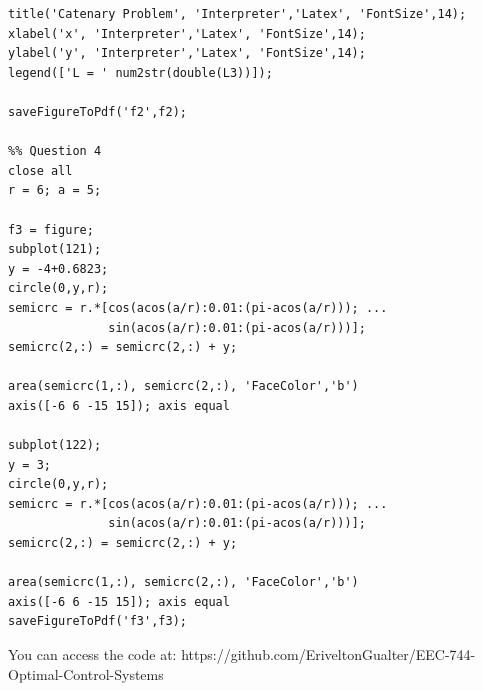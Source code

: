 \documentclass{article}
\begin{document}
\begin{lstlisting}
title('Catenary Problem', 'Interpreter','Latex', 'FontSize',14);
xlabel('x', 'Interpreter','Latex', 'FontSize',14);
ylabel('y', 'Interpreter','Latex', 'FontSize',14);
legend(['L = ' num2str(double(L3))]);

saveFigureToPdf('f2',f2);

%% Question 4
close all
r = 6; a = 5; 

f3 = figure;
subplot(121);
y = -4+0.6823;
circle(0,y,r); 
semicrc = r.*[cos(acos(a/r):0.01:(pi-acos(a/r))); ...
              sin(acos(a/r):0.01:(pi-acos(a/r)))];
semicrc(2,:) = semicrc(2,:) + y;

area(semicrc(1,:), semicrc(2,:), 'FaceColor','b')
axis([-6 6 -15 15]); axis equal

subplot(122);
y = 3;
circle(0,y,r); 
semicrc = r.*[cos(acos(a/r):0.01:(pi-acos(a/r))); ...
              sin(acos(a/r):0.01:(pi-acos(a/r)))];
semicrc(2,:) = semicrc(2,:) + y;

area(semicrc(1,:), semicrc(2,:), 'FaceColor','b')
axis([-6 6 -15 15]); axis equal
saveFigureToPdf('f3',f3);

\end{lstlisting}

You can access the code at: https://github.com/EriveltonGualter/EEC-744-Optimal-Control-Systems
\end{document}
